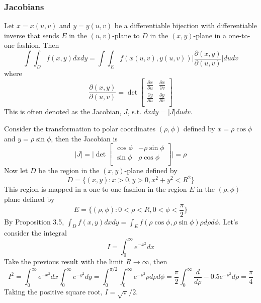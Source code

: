 \documentclass[a4paper]{article}
\begin{document}
\subsubsection*{Jacobians}
\begin{prop}
Let $x=x(u,v)$ and $y=y(u,v)$ be a differentiable bijection with differentiable inverse that sends $E$ in the $(u,v)$-plane to $D$ in the $(x,y)$-plane in a one-to-one fashion. Then
\begin{equation}
    \int\int_Df(x,y)dxdy=\int\int_Ef(x(u,v),y(u,v))\bigg|\frac{\partial(x,y)}{\partial(u,v)}\bigg|dudv\tag{1.18a}
\end{equation}
where 
\begin{equation}
    \frac{\partial(x,y)}{\partial(u,v)}=\det\begin{bmatrix}\frac{\partial x}{\partial u}&\frac{\partial x}{\partial v}\\\frac{\partial y}{\partial u}&\frac{\partial y}{\partial v}\\\end{bmatrix}\tag{1.18b}
\end{equation}
This is often denoted as the Jacobian, $J$, s.t. $dxdy=|J|dudv$.
\end{prop}
\begin{eg}
Consider the transformation to polar coordinates $(\rho,\phi)$ defined by $x=\rho\cos\phi$ and $y=\rho\sin\phi$, then the Jacobian is
$$|J|=\bigg|\det\begin{bmatrix}\cos\phi&-\rho\sin\phi\\\sin\phi&\rho\cos\phi\\\end{bmatrix}\bigg|=\rho$$
Now let $D$ be the region in the $(x,y)$-plane defined by
$$D=\{(x,y):x>0,y>0,x^2+y^2<R^2\}$$
This region is mapped in a one-to-one fashion in the region $E$ in the $(\rho,\phi)$-plane defined by
$$E=\{(\rho,\phi):0<\rho<R,0<\phi<\frac{\pi}{2}\}$$
By Proposition 3.5, $\int_Df(x,y)dxdy=\int_Ef(\rho\cos\phi,\rho\sin\phi)\rho d\rho d\phi$. Let's consider the integral
$$I=\int_0^\infty e^{-x^2}dx$$
Take the previous result with the limit $R\rightarrow\infty$, then
$$I^2=\int_0^\infty e^{-x^2}dx\int_0^\infty e^{-y^2}dy=\int_0^{\pi/2}\int_0^\infty  e^{-\rho^2}\rho d\rho d\phi=\frac{\pi}{2}\int_0^\infty\frac{d}{d\rho}-0.5e^{-\rho^2}d\rho=\frac{\pi}{4}$$
Taking the positive square root, $I=\sqrt{\pi}/2$.
\end{eg}
\end{document}
